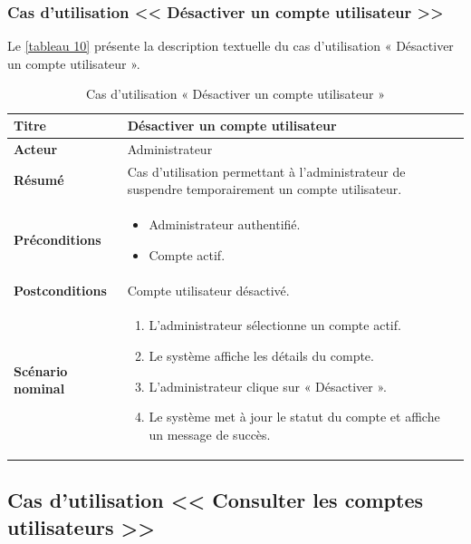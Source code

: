 \subsubsection{Cas d'utilisation << Désactiver un compte utilisateur >>}

Le \autoref{tableau 10} présente la description textuelle du cas d'utilisation « Désactiver un compte utilisateur ».

\begin{table}[H]
\centering
\renewcommand{\arraystretch}{1.4}
\begin{tabular}{|p{4cm}|p{10cm}|}
\hline
\textbf{Titre} & Désactiver un compte utilisateur \\
\hline
\textbf{Acteur} & Administrateur \\
\hline
\textbf{Résumé} & Cas d'utilisation permettant à l'administrateur de suspendre temporairement un compte utilisateur. \\
\hline
\textbf{Préconditions} &
\vspace{-12pt}
\begin{itemize}
    \item Administrateur authentifié.
    \item Compte actif.
\end{itemize} \\
\hline
\textbf{Postconditions} & Compte utilisateur désactivé. \\
\hline
\textbf{Scénario nominal} &
\vspace{-12pt}
\begin{enumerate}
    \item L'administrateur sélectionne un compte actif.
    \item Le système affiche les détails du compte.
    \item L'administrateur clique sur « Désactiver ».
    \item Le système met à jour le statut du compte et affiche un message de succès.
\end{enumerate} \\
\hline
\end{tabular}
\caption{Cas d'utilisation « Désactiver un compte utilisateur »}
\label{tableau 10}
\end{table}

\subsection{Cas d'utilisation << Consulter les comptes utilisateurs >>}

